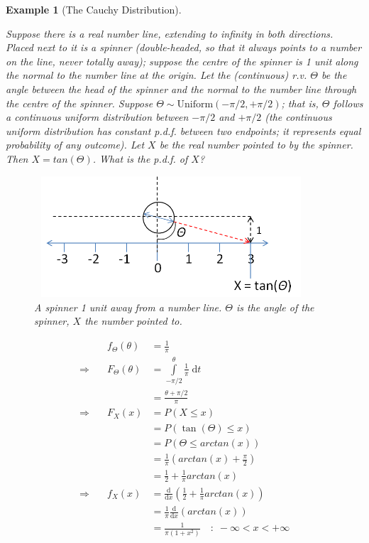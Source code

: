 \documentclass[12pt,a4paper]{article}
\newtheorem{ex}[thm]{Example}
\begin{document}
\begin{ex}[The Cauchy Distribution]\label{Cauchy}
\vspace{1cm}

Suppose there is a real number line, extending to infinity in both directions. Placed next to it is a spinner (double-headed, so that it always points to a number on the line, never totally away); suppose the centre of the spinner is 1 unit along the normal to the number line at the origin. Let the (continuous) r.v. $\Theta$ be the angle between the head of the spinner and the normal to the number line through the centre of the spinner. Suppose $\Theta \sim \text{Uniform}(-\pi/2, +\pi/2)$; that is, $\Theta$ follows a continuous uniform distribution between $-\pi/2$ and $+\pi/2$ (the continuous uniform distribution has constant p.d.f. between two endpoints; it represents equal probability of any outcome). Let $X$ be the real number pointed to by the spinner. Then $X = tan(\Theta)$. What is the p.d.f. of $X$?

\begin{figure}[h]
\begin{center}
\includegraphics[height=45.1mm,width=102mm]{M2S1 Cauchy Figure.png}
\caption{A spinner 1 unit away from a number line. $\Theta$ is the angle of the spinner, $X$ the number pointed to.}
\end{center}
\end{figure}

\begingroup
\renewcommand*{\arraystretch}{1.5}
$$\begin{array}{rll}
&f_\Theta (\theta) &= \frac{1}{\pi}\\
\Rightarrow \quad &F_\Theta (\theta) &= \int\limits_{-\pi/2}^{\theta}\!\! \frac{1}{\pi} \;\mathrm{d}t\\
& &=\frac{\theta + \pi/2}{\pi}\\
\Rightarrow \quad &F_X(x) &= P(X \leq x)\\
& &= P\left(\tan(\Theta) \leq x \right)\\
& &= P\left(\Theta \leq arctan(x)\right)\\
& &= \frac{1}{\pi}\left(arctan (x) + \frac{\pi}{2}\right)\\
& &= \frac{1}{2} + \frac{1}{\pi} arctan(x)\\
\Rightarrow \quad &f_X(x) &= \frac{\mathrm{d}}{\mathrm{d}x}\left(\frac{1}{2} + \frac{1}{\pi} arctan(x)\right)\\
& &= \frac{1}{\pi} \frac{\mathrm{d}}{\mathrm{d}x}\left( arctan(x)\right)\\
& &= \frac{1}{\pi (1 + x^2)} \quad : \; -\infty < x < +\infty
\end{array}$$

\endgroup
\end{ex}
\end{document}

